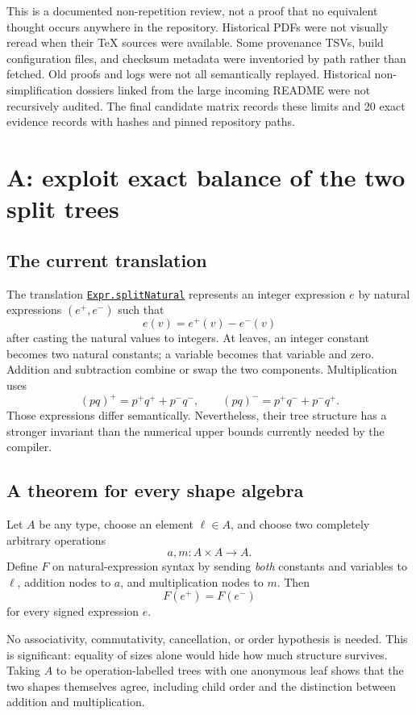 \documentclass[11pt,letterpaper]{article}
\newcommand{\code}[1]{\texttt{\small #1}}
\newcommand{\sourceNamed}[2]{\href{https://github.com/VladimirReshetnikov/ProveIt/blob/9d9d1123b39927d30363f1dcd53c23f0575c30ee/Computability/DiophantineConsistency/Lean/DiophantineConsistency/#1.lean}{\code{#2}}}
\begin{document}
This is a documented non-repetition review, not a proof that no equivalent thought occurs anywhere in the repository. Historical PDFs were not visually reread when their TeX sources were available. Some provenance TSVs, build configuration files, and checksum metadata were inventoried by path rather than fetched. Old proofs and logs were not all semantically replayed. Historical non-simplification dossiers linked from the large incoming README were not recursively audited. The final candidate matrix records these limits and 20 exact evidence records with hashes and pinned repository paths.

\section{A: exploit exact balance of the two split trees}

\subsection{The current translation}

The translation \sourceNamed{NaturalExpression}{Expr.splitNatural} represents an integer expression $e$ by natural expressions $(e^+,e^-)$ such that
\[
 e(v)=e^+(v)-e^-(v)
\]
after casting the natural values to integers. At leaves, an integer constant becomes two natural constants; a variable becomes that variable and zero. Addition and subtraction combine or swap the two components. Multiplication uses
\[
 (pq)^+=p^+q^++p^-q^-,\qquad
 (pq)^-=p^+q^-+p^-q^+.
\]
Those expressions differ semantically. Nevertheless, their tree structure has a stronger invariant than the numerical upper bounds currently needed by the compiler.

\subsection{A theorem for every shape algebra}

Let $A$ be any type, choose an element $\ell\in A$, and choose two completely arbitrary operations
\[
 a,m:A\times A\longrightarrow A.
\]
Define $F$ on natural-expression syntax by sending \emph{both} constants and variables to $\ell$, addition nodes to $a$, and multiplication nodes to $m$. Then
\begin{equation}\label{eq:shape}
 F(e^+)=F(e^-)
\end{equation}
for every signed expression $e$.

No associativity, commutativity, cancellation, or order hypothesis is needed. This is significant: equality of sizes alone would hide how much structure survives. Taking $A$ to be operation-labelled trees with one anonymous leaf shows that the two shapes themselves agree, including child order and the distinction between addition and multiplication.
\end{document}

